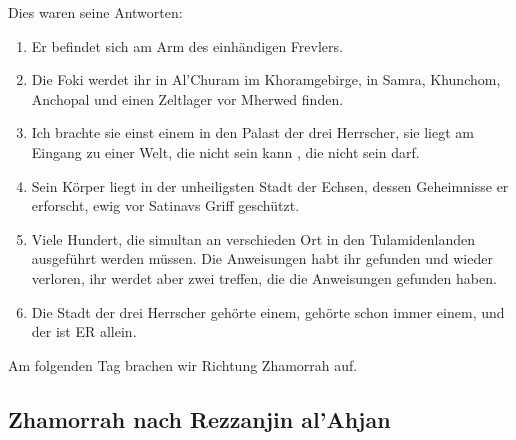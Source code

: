 Dies waren seine Antworten:
\begin{enumerate}
    \item Er befindet sich am Arm des einhändigen Frevlers.
    \item Die Foki werdet ihr in Al'Churam im Khoramgebirge, in Samra, Khunchom, Anchopal und einen Zeltlager vor Mherwed finden.
    \item Ich brachte sie einst einem in den Palast der drei Herrscher, sie liegt am Eingang zu einer Welt, die nicht sein kann , die nicht sein darf.
    \item Sein Körper liegt in der unheiligsten Stadt der Echsen, dessen Geheimnisse er erforscht, ewig vor Satinavs Griff geschützt.
    \item Viele Hundert, die simultan an verschieden Ort in den Tulamidenlanden ausgeführt werden müssen. Die Anweisungen habt ihr gefunden und wieder verloren, ihr werdet aber zwei treffen, die die Anweisungen gefunden haben.
    \item Die Stadt der drei Herrscher gehörte einem, gehörte schon immer einem, und der ist ER allein.
\end{enumerate}


Am folgenden Tag brachen wir Richtung Zhamorrah auf.

\subsection{Zhamorrah nach Rezzanjin al'Ahjan}


